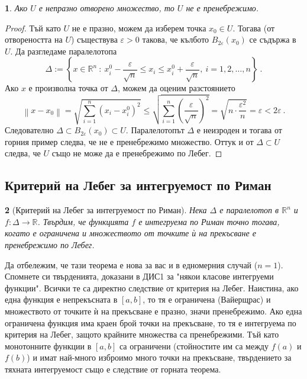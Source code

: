 \documentclass[11pt]{article}
\numberwithin{equation}{section}
\numberwithin{figure}{section}
\numberwithin{table}{section}
\theoremstyle{plain}
\newtheorem{thm}{\protect\theoremname}[section]
\theoremstyle{definition}
\theoremstyle{remark}
\theoremstyle{definition}
\theoremstyle{remark}
\theoremstyle{plain}
\theoremstyle{definition}
\theoremstyle{definition}
\theoremstyle{plain}
\theoremstyle{plain}
\newtheorem{prop}[thm]{\protect\propositionname}
\theoremstyle{plain}
\theoremstyle{definition}
\theoremstyle{plain}
\providecommand{\propositionname}{Твърдение}
\providecommand{\theoremname}{Теорема}
\newcommand*{\R}{\mathbb{R}}
\begin{document}
\begin{prop}
Ако $U$ е непразно отворено множество, то  $U$ не е пренебрежимо.
\end{prop}
\begin{proof}
Тъй като $U$ не е празно, можем да изберем точка $x_0\in U$. Тогава (от отвореността на $U$) съществува $\varepsilon >0$ такова, че кълбото $B_{2\varepsilon} (x_0)$ се съдържа в $U$. Да разгледаме паралелотопа
$$\Delta := \left\{x\in\R^n \ : \  x_{i}^0 - \frac{\varepsilon}{\sqrt{n}} \leq x_i \leq  x_{i}^0 +\frac{\varepsilon}{\sqrt{n}}, \ i=1,2,\dots , n\right\} \ .$$
Ако $x$ е произволна точка от $\Delta$, можем да оценим разстоянието
$$\left\| x-x_0\right\| =\sqrt{\sum_{i=1}^n\left( x_i-x^0_i\right)^2} \le \sqrt{\sum_{i=1}^n\left(\frac{\varepsilon}{\sqrt{n}}\right)^2} =\sqrt{n \cdot \frac{\varepsilon^2}{n}}=\varepsilon <2\varepsilon\ .$$
 Следователно $\Delta \subset B_{2\varepsilon}(x_0)\subset U$. Паралелотопът $\Delta$ е неизроден и тогава от горния пример следва, че не е пренебрежимо множество. Оттук и от $\Delta \subset U$ следва, че $U$ също не може да е пренебрежимо по Лебег.
\end{proof}

\subsection{Критерий на Лебег за интегруемост по Риман}

\begin{thm}[Критерий на Лебег за интегруемост по Риман]
Нека $\Delta$ е паралелотоп в $\R^n$ и $f:\Delta \longrightarrow \R$. Твърдим, че функцията $f$ е интегруема по Риман точно тогава, когато е ограничена и
множеството от точките \`{и} на прекъсване  е пренебрежимо по Лебег.
\end{thm}

\medskip
Да отбележим, че тази теорема е нова за вас и в едномерния случай ($n=1$). Спомнете си твърденията, доказани в ДИС1 за "някои класове интегруеми функции". Всички те са директно следствие от критерия на Лебег. Наистина, ако една функция е непрекъсната в $[a,b]$, то тя е ограничена (Вайерщрас) и множеството от точките \`{и} на прекъсване е празно, значи пренебрежимо. Ако една ограничена функция има краен брой точки на прекъсване, то тя е интегруема по критерия на Лебег, защото крайните множества са пренебрежими. Тъй като монотонните функции в $[a,b]$ са ограничени (стойностите им са между $f(a)$ и $f(b)$) и имат най-много изброимо много точки на прекъсване, твърдението за тяхната интегруемост също е следствие от горната теорема.
\medskip
\end{document}
